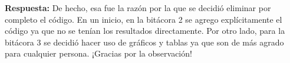 \begin{enumerate}
    \textbf{Respuesta: }De hecho, esa fue la razón por la que se decidió eliminar por completo el código. En un inicio, en la bitácora 2 se agrego explícitamente el código ya que no se tenían los resultados directamente. Por otro lado, para la bitácora 3 se decidió hacer uso de gráficos y tablas ya que son de más agrado para cualquier persona. ¡Gracias por la observación!
    
\end{enumerate}




